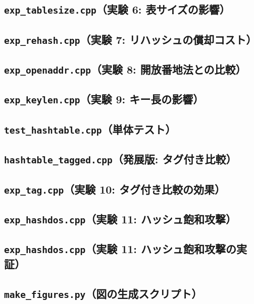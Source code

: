 \subsection{{\tt exp\_tablesize.cpp}（実験 6: 表サイズの影響）}
{\scriptsize}

\subsection{{\tt exp\_rehash.cpp}（実験 7: リハッシュの償却コスト）}
{\scriptsize}

\subsection{{\tt exp\_openaddr.cpp}（実験 8: 開放番地法との比較）}
{\scriptsize}

\subsection{{\tt exp\_keylen.cpp}（実験 9: キー長の影響）}
{\scriptsize}

\subsection{{\tt test\_hashtable.cpp}（単体テスト）}
{\scriptsize}

\subsection{{\tt hashtable\_tagged.cpp}（発展版: タグ付き比較）}
{\scriptsize}

\subsection{{\tt exp\_tag.cpp}（実験 10: タグ付き比較の効果）}
{\scriptsize}

\subsection{{\tt exp\_hashdos.cpp}（実験 11: ハッシュ飽和攻撃）}
{\scriptsize}

\subsection{{\tt exp\_hashdos.cpp}（実験 11: ハッシュ飽和攻撃の実証）}
{\scriptsize}

\subsection{{\tt make\_figures.py}（図の生成スクリプト）}
{\scriptsize}
